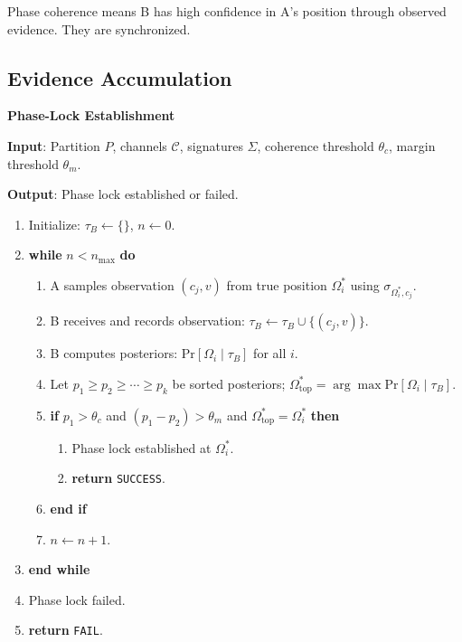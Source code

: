 \documentclass[11pt,a4paper]{article}
\theoremstyle{definition}
\newcommand{\pr}[1]{\mathrm{Pr}\left[#1\right]}
\newcommand{\given}{\mid}
\begin{document}
Phase coherence means B has high confidence in A's position through observed evidence. They are synchronized.

\subsection{Evidence Accumulation}

\begin{algorithm}
\textbf{Phase-Lock Establishment}

\textbf{Input}: Partition $P$, channels $\mathcal{C}$, signatures $\Sigma$, coherence threshold $\theta_c$, margin threshold $\theta_m$.

\textbf{Output}: Phase lock established or failed.

\begin{enumerate}
\item Initialize: $\tau_B \leftarrow \{\}$, $n \leftarrow 0$.
\item \textbf{while} $n < n_{\max}$ \textbf{do}
  \begin{enumerate}
  \item A samples observation $(c_j, v)$ from true position $\Omega_i^*$ using $\sigma_{\Omega_i^*, c_j}$.
  \item B receives and records observation: $\tau_B \leftarrow \tau_B \cup \{(c_j, v)\}$.
  \item B computes posteriors: $\pr{\Omega_i \given \tau_B}$ for all $i$.
  \item Let $p_1 \geq p_2 \geq \cdots \geq p_k$ be sorted posteriors; $\Omega^*_{\text{top}} = \arg\max \pr{\Omega_i \given \tau_B}$.
  \item \textbf{if} $p_1 > \theta_c$ and $(p_1 - p_2) > \theta_m$ and $\Omega^*_{\text{top}} = \Omega_i^*$ \textbf{then}
    \begin{enumerate}
    \item Phase lock established at $\Omega_i^*$.
    \item \textbf{return} \texttt{SUCCESS}.
    \end{enumerate}
  \item \textbf{end if}
  \item $n \leftarrow n + 1$.
  \end{enumerate}
\item \textbf{end while}
\item Phase lock failed.
\item \textbf{return} \texttt{FAIL}.
\end{enumerate}
\end{algorithm}
\end{document}
